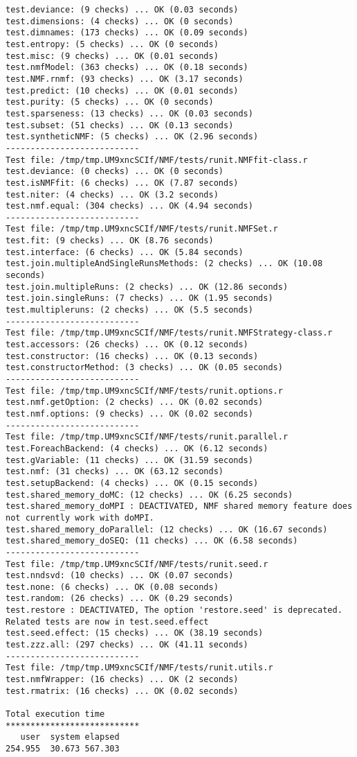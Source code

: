 \documentclass[10pt]{article}
\begin{document}
\begin{verbatim}
test.deviance: (9 checks) ... OK (0.03 seconds)
test.dimensions: (4 checks) ... OK (0 seconds)
test.dimnames: (173 checks) ... OK (0.09 seconds)
test.entropy: (5 checks) ... OK (0 seconds)
test.misc: (9 checks) ... OK (0.01 seconds)
test.nmfModel: (363 checks) ... OK (0.18 seconds)
test.NMF.rnmf: (93 checks) ... OK (3.17 seconds)
test.predict: (10 checks) ... OK (0.01 seconds)
test.purity: (5 checks) ... OK (0 seconds)
test.sparseness: (13 checks) ... OK (0.03 seconds)
test.subset: (51 checks) ... OK (0.13 seconds)
test.syntheticNMF: (5 checks) ... OK (2.96 seconds)
--------------------------- 
Test file: /tmp/tmp.UM9xncSCIf/NMF/tests/runit.NMFfit-class.r 
test.deviance: (0 checks) ... OK (0 seconds)
test.isNMFfit: (6 checks) ... OK (7.87 seconds)
test.niter: (4 checks) ... OK (3.2 seconds)
test.nmf.equal: (304 checks) ... OK (4.94 seconds)
--------------------------- 
Test file: /tmp/tmp.UM9xncSCIf/NMF/tests/runit.NMFSet.r 
test.fit: (9 checks) ... OK (8.76 seconds)
test.interface: (6 checks) ... OK (5.84 seconds)
test.join.multipleAndSingleRunsMethods: (2 checks) ... OK (10.08 seconds)
test.join.multipleRuns: (2 checks) ... OK (12.86 seconds)
test.join.singleRuns: (7 checks) ... OK (1.95 seconds)
test.multipleruns: (2 checks) ... OK (5.5 seconds)
--------------------------- 
Test file: /tmp/tmp.UM9xncSCIf/NMF/tests/runit.NMFStrategy-class.r 
test.accessors: (26 checks) ... OK (0.12 seconds)
test.constructor: (16 checks) ... OK (0.13 seconds)
test.constructorMethod: (3 checks) ... OK (0.05 seconds)
--------------------------- 
Test file: /tmp/tmp.UM9xncSCIf/NMF/tests/runit.options.r 
test.nmf.getOption: (2 checks) ... OK (0.02 seconds)
test.nmf.options: (9 checks) ... OK (0.02 seconds)
--------------------------- 
Test file: /tmp/tmp.UM9xncSCIf/NMF/tests/runit.parallel.r 
test.ForeachBackend: (4 checks) ... OK (6.12 seconds)
test.gVariable: (11 checks) ... OK (31.59 seconds)
test.nmf: (31 checks) ... OK (63.12 seconds)
test.setupBackend: (4 checks) ... OK (0.15 seconds)
test.shared_memory_doMC: (12 checks) ... OK (6.25 seconds)
test.shared_memory_doMPI : DEACTIVATED, NMF shared memory feature does not currently work with doMPI.
test.shared_memory_doParallel: (12 checks) ... OK (16.67 seconds)
test.shared_memory_doSEQ: (11 checks) ... OK (6.58 seconds)
--------------------------- 
Test file: /tmp/tmp.UM9xncSCIf/NMF/tests/runit.seed.r 
test.nndsvd: (10 checks) ... OK (0.07 seconds)
test.none: (6 checks) ... OK (0.08 seconds)
test.random: (26 checks) ... OK (0.29 seconds)
test.restore : DEACTIVATED, The option 'restore.seed' is deprecated. Related tests are now in test.seed.effect
test.seed.effect: (15 checks) ... OK (38.19 seconds)
test.zzz.all: (297 checks) ... OK (41.11 seconds)
--------------------------- 
Test file: /tmp/tmp.UM9xncSCIf/NMF/tests/runit.utils.r 
test.nmfWrapper: (16 checks) ... OK (2 seconds)
test.rmatrix: (16 checks) ... OK (0.02 seconds)

Total execution time
***************************
   user  system elapsed 
254.955  30.673 567.303 

\end{verbatim}
\end{document}
